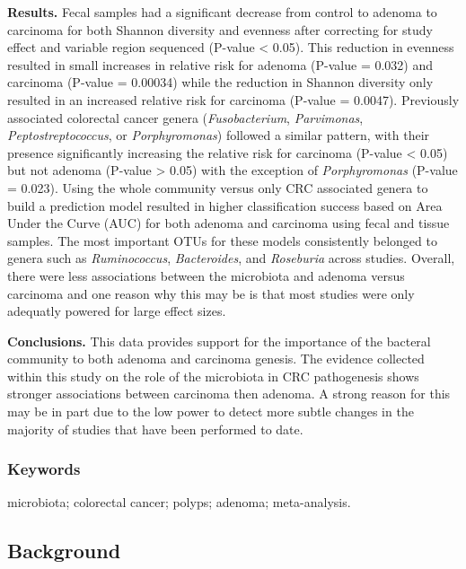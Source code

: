 \documentclass[12pt,]{article}
\begin{document}
\textbf{Results.} Fecal samples had a significant decrease from control
to adenoma to carcinoma for both Shannon diversity and evenness after
correcting for study effect and variable region sequenced (P-value
\textless{} 0.05). This reduction in evenness resulted in small
increases in relative risk for adenoma (P-value = 0.032) and carcinoma
(P-value = 0.00034) while the reduction in Shannon diversity only
resulted in an increased relative risk for carcinoma (P-value = 0.0047).
Previously associated colorectal cancer genera (\emph{Fusobacterium},
\emph{Parvimonas}, \emph{Peptostreptococcus}, or \emph{Porphyromonas})
followed a similar pattern, with their presence significantly increasing
the relative risk for carcinoma (P-value \textless{} 0.05) but not
adenoma (P-value \textgreater{} 0.05) with the exception of
\emph{Porphyromonas} (P-value = 0.023). Using the whole community versus
only CRC associated genera to build a prediction model resulted in
higher classification success based on Area Under the Curve (AUC) for
both adenoma and carcinoma using fecal and tissue samples. The most
important OTUs for these models consistently belonged to genera such as
\emph{Ruminococcus}, \emph{Bacteroides}, and \emph{Roseburia} across
studies. Overall, there were less associations between the microbiota
and adenoma versus carcinoma and one reason why this may be is that most
studies were only adequatly powered for large effect sizes.

\textbf{Conclusions.} This data provides support for the importance of
the bacteral community to both adenoma and carcinoma genesis. The
evidence collected within this study on the role of the microbiota in
CRC pathogenesis shows stronger associations between carcinoma then
adenoma. A strong reason for this may be in part due to the low power to
detect more subtle changes in the majority of studies that have been
performed to date.

\subsubsection{Keywords}\label{keywords}

microbiota; colorectal cancer; polyps; adenoma; meta-analysis.

\newpage

\subsection{Background}\label{background}
\end{document}
